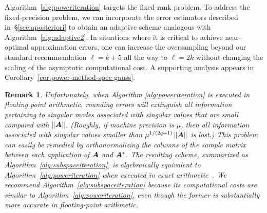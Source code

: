 \documentclass{article}
\newtheorem{remark}{Remark}
\begin{document}
Algorithm~\ref{alg:poweriteration} targets the fixed-rank problem.  To address the fixed-precision
problem, we can incorporate the error estimators described in~\S\ref{sec:aposteriori}
to obtain an adaptive scheme analogous with Algorithm~\ref{alg:adaptive2}.
In situations where it is critical to achieve near-optimal approximation errors,
one can increase the oversampling beyond our standard recommendation
$\ell = k + 5$ all the way to $\ell = 2k$ without changing the
scaling of the asymptotic computational cost.  %
A supporting analysis appears
in Corollary~\ref{cor:power-method-spec-gauss}.

\lsp

\begin{remark} \rm
\label{remark:roundoff_in_powerscheme}
Unfortunately, when Algorithm \ref{alg:poweriteration} is executed in floating point arithmetic,
rounding errors will extinguish all information pertaining to singular modes associated with
singular values that are small compared with $\left\Vert {\bm{A}} \right\Vert$. (Roughly, if machine
precision is $\mu$, then all information associated with singular values smaller than
$\mu^{1/(2q+1)} \left\Vert {\bm{A}} \right\Vert$ is lost.) This problem can easily be remedied
by orthonormalizing
the columns of the sample matrix between each application of $\bm{A}$ and $\bm{A}^{*}$.
The resulting scheme, summarized as Algorithm~\ref{alg:subspaceiteration}, is algebraically
equivalent to Algorithm~\ref{alg:poweriteration} when executed in exact arithmetic~\cite{stewart1969,Szlam10}.
We recommend Algorithm~\ref{alg:subspaceiteration} because its computational costs are similar to
Algorithm~\ref{alg:poweriteration}, even though the former is substantially more accurate in
floating-point arithmetic.

\end{remark}

\lsp
\end{document}
